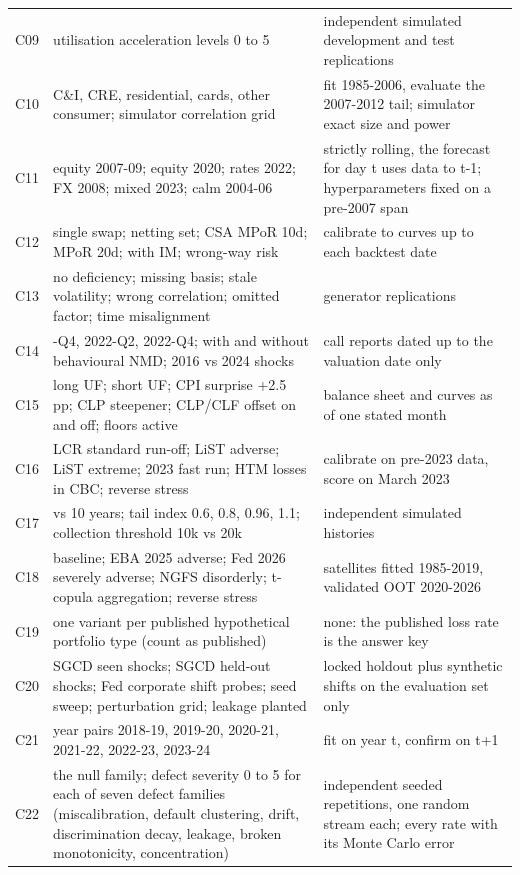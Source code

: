 {\begin{longtable}{l>{\raggedright\arraybackslash}p{6.2cm}>{\raggedright\arraybackslash}p{8.0cm}}
C09 & utilisation acceleration levels 0 to 5 & independent simulated development and test replications \\
C10 & C\&I, CRE, residential, cards, other consumer; simulator correlation grid & fit 1985-2006, evaluate the 2007-2012 tail; simulator exact size and power \\
C11 & equity 2007-09; equity 2020; rates 2022; FX 2008; mixed 2023; calm 2004-06 & strictly rolling, the forecast for day t uses data to t-1; hyperparameters fixed on a pre-2007 span \\
C12 & single swap; netting set; CSA MPoR 10d; MPoR 20d; with IM; wrong-way risk & calibrate to curves up to each backtest date \\
C13 & no deficiency; missing basis; stale volatility; wrong correlation; omitted factor; time misalignment & generator replications \\
C14 & 2021-Q4, 2022-Q2, 2022-Q4; with and without behavioural NMD; 2016 vs 2024 shocks & call reports dated up to the valuation date only \\
C15 & long UF; short UF; CPI surprise +2.5 pp; CLP steepener; CLP/CLF offset on and off; floors active & balance sheet and curves as of one stated month \\
C16 & LCR standard run-off; LiST adverse; LiST extreme; 2023 fast run; HTM losses in CBC; reverse stress & calibrate on pre-2023 data, score on March 2023 \\
C17 & 5 vs 10 years; tail index 0.6, 0.8, 0.96, 1.1; collection threshold 10k vs 20k & independent simulated histories \\
C18 & baseline; EBA 2025 adverse; Fed 2026 severely adverse; NGFS disorderly; t-copula aggregation; reverse stress & satellites fitted 1985-2019, validated OOT 2020-2026 \\
C19 & one variant per published hypothetical portfolio type (count as published) & none: the published loss rate is the answer key \\
C20 & SGCD seen shocks; SGCD held-out shocks; Fed corporate shift probes; seed sweep; perturbation grid; leakage planted & locked holdout plus synthetic shifts on the evaluation set only \\
C21 & year pairs 2018-19, 2019-20, 2020-21, 2021-22, 2022-23, 2023-24 & fit on year t, confirm on t+1 \\
C22 & the null family; defect severity 0 to 5 for each of seven defect families (miscalibration, default clustering, drift, discrimination decay, leakage, broken monotonicity, concentration) & independent seeded repetitions, one random stream each; every rate with its Monte Carlo error \\
\end{longtable}
}
